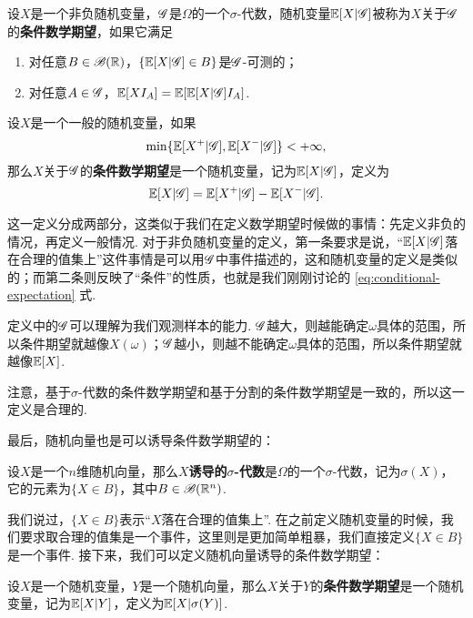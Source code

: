 \begin{definition}\label{def:conditional-expectation-2}
设$X$是一个非负随机变量，$\mathscr{G}$是$\Omega$的一个$\sigma$-代数，随机变量$\mathbb{E}[X|\mathscr{G}]$被称为$X$关于$\mathscr{G}$的\textbf{条件数学期望}，如果它满足
\begin{enumerate}
    \item 对任意$B\in\mathscr{B}(\mathbb{R})$，$\{\mathbb{E}[X|\mathscr{G}]\in B\}$是$\mathscr{G}$-可测的；
    \item 对任意$A\in\mathscr{G}$，$\mathbb{E}[XI_A]=\mathbb{E}[\mathbb{E}[X|\mathscr{G}]I_A]$.
\end{enumerate}

设$X$是一个一般的随机变量，如果
\[\min\{\mathbb{E}[X^+|\mathscr{G}],\mathbb{E}[X^-|\mathscr{G}]\}<+\infty,\]
那么$X$关于$\mathscr{G}$的\textbf{条件数学期望}是一个随机变量，记为$\mathbb{E}[X|\mathscr{G}]$，定义为
\[\mathbb{E}[X|\mathscr{G}]=\mathbb{E}[X^+|\mathscr{G}]-\mathbb{E}[X^-|\mathscr{G}].\]
\end{definition}

这一定义分成两部分，这类似于我们在定义数学期望时候做的事情：先定义非负的情况，再定义一般情况. 对于非负随机变量的定义，第一条要求是说，“$\mathbb{E}[X|\mathscr{G}]$落在合理的值集上”这件事情是可以用$\mathscr{G}$中事件描述的，这和随机变量的定义是类似的；而第二条则反映了“条件”的性质，也就是我们刚刚讨论的 \eqref{eq:conditional-expectation} 式. 

定义中的$\mathscr{G}$可以理解为我们观测样本的能力. $\mathscr{G}$越大，则越能确定$\omega$具体的范围，所以条件期望就越像$X(\omega)$；$\mathscr{G}$越小，则越不能确定$\omega$具体的范围，所以条件期望就越像$\mathbb{E}[X]$.

注意，基于$\sigma$-代数的条件数学期望和基于分割的条件数学期望是一致的，所以这一定义是合理的. 

最后，随机向量也是可以诱导条件数学期望的：

\begin{definition}
设$X$是一个$n$维随机向量，那么\textbf{$X$诱导的$\sigma$-代数}是$\Omega$的一个$\sigma$-代数，记为$\sigma(X)$，它的元素为$\{X\in B\}$，其中$B\in\mathscr{B}(\mathbb{R}^n)$.
\end{definition}

我们说过，$\{X\in B\}$表示“$X$落在合理的值集上”. 在之前定义随机变量的时候，我们要求取合理的值集是一个事件，这里则是更加简单粗暴，我们直接定义$\{X\in B\}$是一个事件. 接下来，我们可以定义随机向量诱导的条件数学期望：

\begin{definition}[随机向量诱导的条件数学期望]\label{def:conditional-expectation-vector}
设$X$是一个随机变量，$Y$是一个随机向量，那么$X$关于$Y$的\textbf{条件数学期望}是一个随机变量，记为$\mathbb{E}[X|Y]$，定义为$\mathbb{E}[X|\sigma(Y)]$.
\end{definition}

